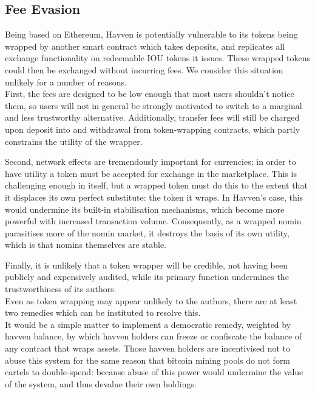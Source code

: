 \newpage

\subsection{Fee Evasion}

\noindent Being based on Ethereum, Havven is potentially vulnerable to its
tokens being wrapped by another smart contract which takes deposits, and
replicates all exchange functionality on redeemable IOU tokens it issues.
These wrapped tokens could then be exchanged without incurring fees.
\noindent We consider this situation unlikely for a number of reasons. \\

\noindent First, the fees are designed to be low enough that most users
shouldn't notice them, so users will not in general be strongly motivated to
switch to a marginal and less trustworthy alternative. Additionally, transfer
fees will still be charged upon deposit into and withdrawal from
token-wrapping contracts, which partly constrains the utility of the wrapper.

\noindent Second, network effects are tremendously important for currencies;
in order to have utility a token must be accepted for exchange in the
marketplace. This is challenging enough in itself, but a wrapped token must
do this to the extent that it displaces its own perfect substitute: the token
it wraps.
In Havven's case, this would undermine its built-in
stabilisation mechanisms, which become more powerful with increased
transaction volume. Consequently, as a wrapped nomin parasitises more of the
nomin market, it destroys the basis of its own utility, which is that nomins
themselves are stable.

\noindent Finally, it is unlikely that a token wrapper will be credible, not
having been publicly and expensively audited, while its primary function
undermines the trustworthiness of its authors. \\

\noindent Even as token wrapping may appear unlikely to the authors, there
are at least two remedies which can be instituted to resolve this. \\

\noindent It would be a simple matter to implement a democratic remedy,
weighted by havven balance, by which havven holders can freeze or confiscate the
balance of any contract that wraps assets. Those havven holders are
incentivised not to abuse this system for the same reason that bitcoin
mining pools do not form cartels to double-spend: because abuse of this
power would undermine the value of the system, and thus devalue their
own holdings.

